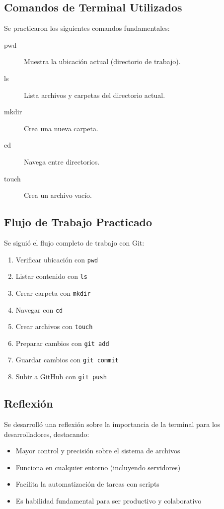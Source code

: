 \documentclass[12pt,a4paper]{article}
\begin{document}
\subsection{Comandos de Terminal Utilizados}

Se practicaron los siguientes comandos fundamentales:

\begin{description}
    \item[pwd] Muestra la ubicación actual (directorio de trabajo).
    \item[ls] Lista archivos y carpetas del directorio actual.
    \item[mkdir] Crea una nueva carpeta.
    \item[cd] Navega entre directorios.
    \item[touch] Crea un archivo vacío.
\end{description}

\subsection{Flujo de Trabajo Practicado}

Se siguió el flujo completo de trabajo con Git:

\begin{enumerate}
    \item Verificar ubicación con \texttt{pwd}
    \item Listar contenido con \texttt{ls}
    \item Crear carpeta con \texttt{mkdir}
    \item Navegar con \texttt{cd}
    \item Crear archivos con \texttt{touch}
    \item Preparar cambios con \texttt{git add}
    \item Guardar cambios con \texttt{git commit}
    \item Subir a GitHub con \texttt{git push}
\end{enumerate}

\subsection{Reflexión}

Se desarrolló una reflexión sobre la importancia de la terminal para los desarrolladores, destacando:

\begin{itemize}
    \item Mayor control y precisión sobre el sistema de archivos
    \item Funciona en cualquier entorno (incluyendo servidores)
    \item Facilita la automatización de tareas con scripts
    \item Es habilidad fundamental para ser productivo y colaborativo
\end{itemize}
\end{document}
